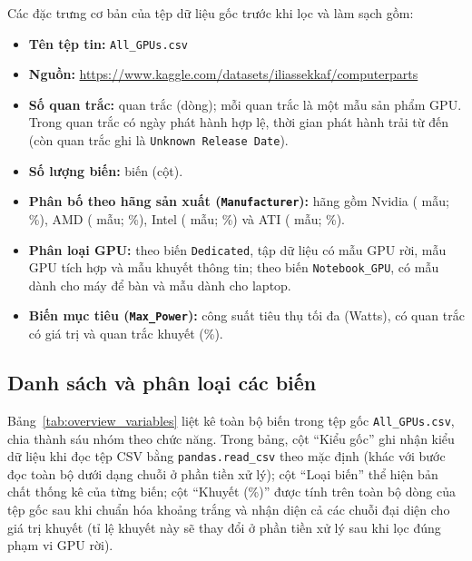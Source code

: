Các đặc trưng cơ bản của tệp dữ liệu gốc trước khi lọc và làm sạch gồm:
\begin{itemize}
  \item \textbf{Tên tệp tin:} \texttt{All\_GPUs.csv}
  \item \textbf{Nguồn:} {\small\url{https://www.kaggle.com/datasets/iliassekkaf/computerparts}}
  \item \textbf{Số quan trắc:} \OvwRowsRaw{} quan trắc (dòng); mỗi quan trắc là một mẫu
    sản phẩm GPU. Trong \OvwDateValid{} quan trắc có ngày phát hành hợp lệ, thời gian phát
    hành trải từ \OvwDateMin{} đến \OvwDateMax{} (còn \OvwDateUnknown{} quan trắc ghi là
    \texttt{Unknown Release Date}).
  \item \textbf{Số lượng biến:} \OvwColsRaw{} biến (cột).
  \item \textbf{Phân bố theo hãng sản xuất (\texttt{Manufacturer}):} \OvwManufacturerLevels{}
    hãng gồm Nvidia (\OvwNvidiaCount{} mẫu; \OvwNvidiaPct{}\%), AMD (\OvwAmdCount{} mẫu;
    \OvwAmdPct{}\%), Intel (\OvwIntelCount{} mẫu; \OvwIntelPct{}\%) và ATI (\OvwAtiCount{}
    mẫu; \OvwAtiPct{}\%).
  \item \textbf{Phân loại GPU:} theo biến \texttt{Dedicated}, tập dữ liệu có
    \OvwDedicatedYes{} mẫu GPU rời, \OvwDedicatedNo{} mẫu GPU tích hợp và
    \OvwDedicatedMissing{} mẫu khuyết thông tin; theo biến \texttt{Notebook\_GPU}, có
    \OvwNotebookNo{} mẫu dành cho máy để bàn và \OvwNotebookYes{} mẫu dành cho laptop.
  \item \textbf{Biến mục tiêu (\texttt{Max\_Power}):} công suất tiêu thụ tối đa (Watts),
    có \OvwPowerObserved{} quan trắc có giá trị và \OvwPowerMissing{} quan trắc khuyết
    (\OvwPowerMissingPct{}\%).
\end{itemize}

\subsection{Danh sách và phân loại các biến}

Bảng~\ref{tab:overview_variables} liệt kê toàn bộ \OvwColsRaw{} biến trong tệp gốc
\texttt{All\_GPUs.csv}, chia thành sáu nhóm theo chức năng. Trong bảng, cột ``Kiểu gốc''
ghi nhận kiểu dữ liệu khi đọc tệp CSV bằng \texttt{pandas.read\_csv} theo mặc định (khác
với bước đọc toàn bộ dưới dạng chuỗi ở phần tiền xử lý); cột ``Loại biến'' thể hiện bản
chất thống kê của từng biến; cột ``Khuyết (\%)'' được tính trên toàn bộ \OvwRowsRaw{} dòng
của tệp gốc sau khi chuẩn hóa khoảng trắng và nhận diện cả các chuỗi đại diện cho giá trị
khuyết (tỉ lệ khuyết này sẽ thay đổi ở phần tiền xử lý sau khi lọc đúng phạm vi GPU rời).


